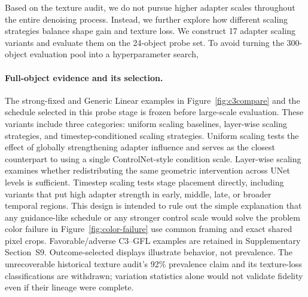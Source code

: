 \documentclass[times,twocolumn,final]{elsarticle}
\providecommand{\DIFadd}[1]{{\protect\color{blue} \sf #1}} %
\providecommand{\DIFdel}[1]{{\protect\color{red} \scriptsize #1}} %
\providecommand{\DIFaddbegin}{} %
\providecommand{\DIFaddend}{} %
\providecommand{\DIFdelbegin}{} %
\providecommand{\DIFdelend}{} %
\begin{document}
\DIFdelbegin \DIFdel{Based on the texture audit, we do not pursue higher adapter scales throughout the entire denoising process. Instead, we further explore how different scaling strategies balance shape gain and texture loss. We construct 17 adapter scaling variants and evaluate them on the 24-object probe set. To avoid turning the 300-object evaluation pool into a hyperparameter search, }\DIFdelend \DIFaddbegin \paragraph{Full-object evidence and its selection.}
\DIFadd{The strong-fixed and Generic Linear examples in Figure~\ref{fig:c3compare} and }\DIFaddend the \DIFdelbegin \DIFdel{schedule selected in this probe stage is frozen before large-scale evaluation.
These variants include three categories: uniform scaling baselines, layer-wise scaling strategies, and timestep-conditioned scaling strategies. Uniform scaling tests the effect of globally strengthening adapter influence and serves as the closest counterpart to using a single ControlNet-style condition scale. Layer-wise scaling examines whether redistributing the same geometric intervention across UNet levels is sufficient. Timestep scaling tests stage placement directly, including variants that put high adapter strength in early, middle, late, or broader temporal regions. This design is intended to rule out the simple explanation that any guidance-like schedule or any stronger control scale would solve the problem}\DIFdelend \DIFaddbegin \DIFadd{color failure in Figure~\ref{fig:color-failure} use common framing and exact shared pixel crops. Favorable/adverse C3--GFL examples are retained in Supplementary Section~S9. Outcome-selected displays illustrate behavior, not prevalence. The unrecoverable historical texture audit's 92\% prevalence claim and its texture-loss classifications are withdrawn; variation statistics alone would not validate fidelity even if their lineage were complete}\DIFaddend .
\end{document}

